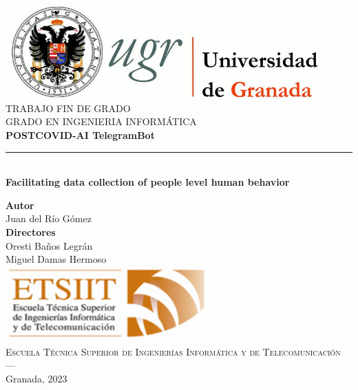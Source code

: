 \begin{titlepage}
 
 
\newlength{\centeroffset}
\setlength{\centeroffset}{-0.5\oddsidemargin}
\addtolength{\centeroffset}{0.5\evensidemargin}
\thispagestyle{empty}

\noindent\hspace*{\centeroffset}\begin{minipage}{\textwidth}

\centering
\includegraphics[width=0.9\textwidth]{imagenes/logo_ugr.jpg}\\[1.4cm]

\textsc{ \Large TRABAJO FIN DE GRADO\\[0.2cm]}
\textsc{ GRADO EN INGENIERIA INFORMÁTICA }\\[1cm]
% 
{\Huge\bfseries POSTCOVID-AI TelegramBot\\
}
\noindent\rule[-1ex]{\textwidth}{3pt}\\[3.5ex]
{\large\bfseries Facilitating data collection of people level human behavior\\
}
\end{minipage}

\vspace{1cm}
\noindent\hspace*{\centeroffset}\begin{minipage}{\textwidth}
\centering

\textbf{Autor}\\ {Juan del Río Gómez}\\[2.5ex]
\textbf{Directores}\\
{Oresti Baños Legrán \\
Miguel Damas Hermoso}\\[1.5cm]
\includegraphics[width=0.6\textwidth]{imagenes/etsiit_logo.png}\\[0.1cm]
\textsc{Escuela Técnica Superior de Ingenierías Informática y de Telecomunicación}\\
\textsc{---}\\
Granada, 2023
\end{minipage}
\end{titlepage}


